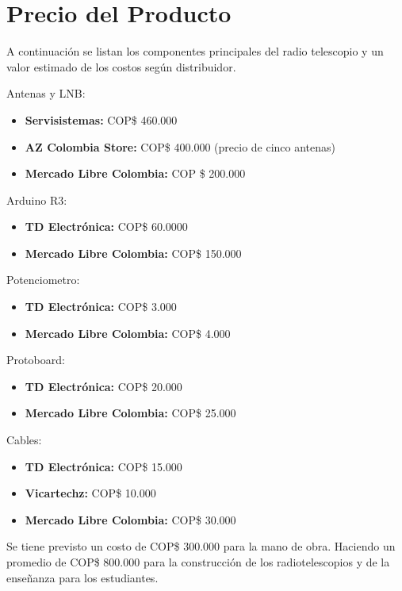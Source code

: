 \section{Precio del Producto}%
\label{sec:Precio del Producto}

A continuación se listan los componentes principales del radio telescopio y
un valor estimado de los costos según distribuidor.

Antenas y LNB:
\begin{itemize}
  \item \textbf{Servisistemas:} COP\$ 460.000
  \item \textbf{AZ Colombia Store:} COP\$ 400.000 (precio de cinco antenas)
  \item \textbf{{Mercado Libre Colombia:}} COP \$ 200.000
\end{itemize}

Arduino R3:
\begin{itemize}
  \item \textbf{TD Electrónica:} COP\$ 60.0000
  \item \textbf{Mercado Libre Colombia:} COP\$ 150.000
\end{itemize}

Potenciometro:
\begin{itemize}
  \item \textbf{TD Electrónica:} COP\$ 3.000
  \item \textbf{Mercado Libre Colombia:} COP\$ 4.000
\end{itemize}

Protoboard:
\begin{itemize}
  \item \textbf{TD Electrónica:} COP\$ 20.000
  \item \textbf{Mercado Libre Colombia:} COP\$ 25.000
\end{itemize}

Cables:
\begin{itemize}
  \item \textbf{TD Electrónica:} COP\$ 15.000
  \item \textbf{Vicartechz:} COP\$ 10.000
  \item \textbf{Mercado Libre Colombia:} COP\$ 30.000
\end{itemize}

Se tiene previsto un costo de COP\$ 300.000 para la mano de obra. Haciendo un
promedio de COP\$ 800.000 para la construcción de los radiotelescopios y de
la enseñanza para los estudiantes.
